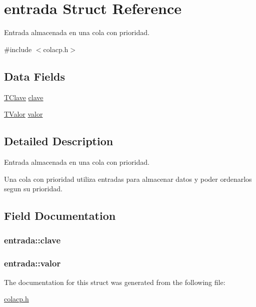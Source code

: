 \hypertarget{structentrada}{\section{entrada Struct Reference}
\label{structentrada}
}


Entrada almacenada en una cola con prioridad.  




{\ttfamily \#include $<$colacp.\+h$>$}

\subsection*{Data Fields}
\begin{DoxyCompactItemize}
\item 
\hyperlink{colacp_8h_a4895683d20e27e82a7b9712cd72dae4a}{T\+Clave} \hyperlink{structentrada_a3753f0727d9c62346f6af755de719b76}{clave}
\item 
\hyperlink{colacp_8h_a1e5e63b8b319da1f3ee4040005f617d2}{T\+Valor} \hyperlink{structentrada_a954667fe7c909f84d12013d833cb5959}{valor}
\end{DoxyCompactItemize}


\subsection{Detailed Description}
Entrada almacenada en una cola con prioridad. 

Una cola con prioridad utiliza entradas para almacenar datos y poder ordenarlos segun su prioridad. 

\subsection{Field Documentation}
\hypertarget{structentrada_a3753f0727d9c62346f6af755de719b76}{
\subsubsection[{clave}]{ entrada\+::clave}}\label{structentrada_a3753f0727d9c62346f6af755de719b76}
\hypertarget{structentrada_a954667fe7c909f84d12013d833cb5959}{
\subsubsection[{valor}]{ entrada\+::valor}}\label{structentrada_a954667fe7c909f84d12013d833cb5959}


The documentation for this struct was generated from the following file\+:\begin{DoxyCompactItemize}
\item 
\hyperlink{colacp_8h}{colacp.\+h}\end{DoxyCompactItemize}
